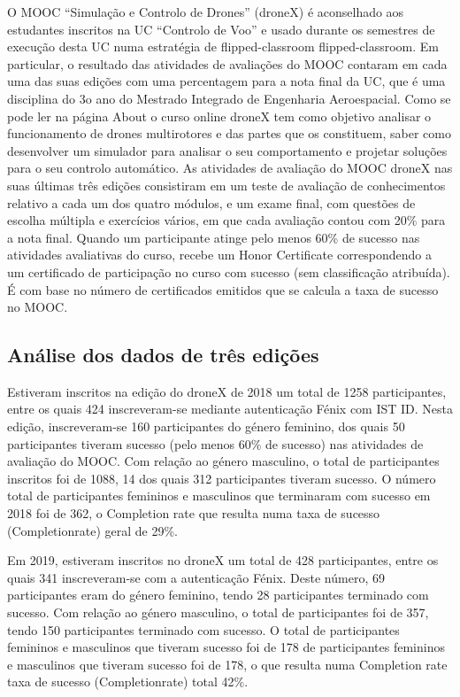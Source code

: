 O MOOC “Simulação e Controlo de Drones” (droneX) é aconselhado aos estudantes
inscritos na UC “Controlo de Voo” e usado durante os semestres de execução desta
UC numa estratégia de flipped-classroom
flipped-classroom. Em particular, o resultado das atividades de avaliações do MOOC contaram em cada uma das suas edições com uma
percentagem para a nota final da UC, que é uma disciplina do 3o ano do Mestrado Integrado de Engenharia Aeroespacial. Como se pode ler na página About o curso online droneX tem como objetivo analisar o funcionamento de drones multirotores e das partes que os constituem,
saber como desenvolver um simulador para analisar o seu comportamento e projetar soluções para o seu controlo automático.
As atividades de avaliação do MOOC droneX nas suas últimas três edições consistiram em um teste de avaliação de conhecimentos relativo a cada um dos quatro módulos, e um exame final, com questões de escolha múltipla e exercícios
vários, em que cada avaliação contou com 20\% para a nota final. Quando um participante atinge pelo menos 60\% de sucesso nas atividades avaliativas do curso, recebe um Honor Certificate correspondendo a um certificado de participação no curso com sucesso (sem classificação atribuída). É com base no número de certificados emitidos que se calcula a taxa de sucesso no MOOC.


\subsection{Análise dos dados de três edições}

Estiveram inscritos na edição do droneX de 2018 um total de 1258 participantes, entre os quais 424 inscreveram-se mediante autenticação Fénix com IST ID. Nesta edição, inscreveram-se 160 participantes do género feminino, dos quais 50 participantes tiveram sucesso (pelo menos 60\% de sucesso) nas atividades de avaliação do MOOC. Com relação ao género masculino, o total de participantes inscritos foi de 1088, 14 dos quais 312 participantes tiveram sucesso. O número total de participantes femininos e masculinos que terminaram com sucesso em 2018 foi de 362, o Completion rate que resulta numa taxa de sucesso (Completionrate) geral de 29\%.

Em 2019, estiveram inscritos no droneX um
total de 428 participantes, entre os quais 341
inscreveram-se com a autenticação Fénix. Deste número, 69 participantes eram do género feminino, tendo 28 participantes terminado com sucesso. Com relação ao género masculino, o total de participantes foi de 357, tendo 150 participantes terminado com sucesso. O total de participantes femininos e masculinos que tiveram sucesso foi de 178 de participantes femininos e masculinos que tiveram sucesso foi de 178, o que resulta numa Completion rate
taxa de sucesso (Completionrate) total 42\%.

